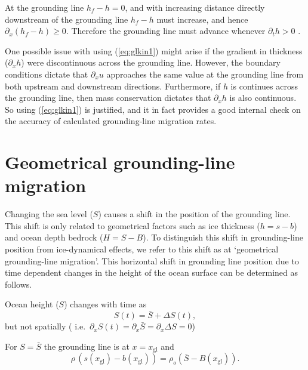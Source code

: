 \documentclass[10pt,a4paper]{book}
\newcommand{\p}{\partial}
\newcommand{\xgl}{x_{\mathrm{gl}}}
\begin{document}
At the grounding line $h_f-h=0$, and with increasing distance directly
downstream of the grounding line $h_f-h$ must increase, and hence
$\p_x (h_f -h) \ge 0$.  Therefore the grounding line must advance
whenever $\p_t h > 0$ .


One possible issue with using (\ref{eq:glkin1}) might arise if the
gradient in thickness ($\p_x h$) were discontinuous across the
grounding line. However, the boundary conditions dictate that $\p_x u$
approaches the same value at the grounding line from both upstream and
downstream directions. Furthermore, if $h$ is continues across the
grounding line, then mass conservation dictates that $\p_x h$ is also
continuous. So using (\ref{eq:glkin1}) is justified, and it in fact
provides a good internal check on the accuracy of calculated
grounding-line migration rates.


\section{Geometrical grounding-line migration}



Changing the sea level ($S$) causes a shift in the position of the
grounding line. This shift is only related to geometrical factors such
as ice thickness ($h=s-b$) and ocean depth bedrock ($H=S-B$). To
distinguish this shift in grounding-line position from ice-dynamical
effects, we refer to this shift as at `geometrical grounding-line
migration'. This horizontal shift in grounding line position due to
time dependent changes in the height of the ocean surface can be determined as
follows.


Ocean height ($S$) changes with time as
\[
S(t)=\bar{S}+\Delta S(t) ,
\]
but not spatially ( i.e.\ $\p_x S(t) = \p_x \bar{S} = \p_x \Delta S=0$) 

For $S=\bar{S}$ the grounding line is at  $x=\xgl$ and
\begin{equation}
\rho \, \left (s(\xgl)-b(\xgl) \right )=\rho_o (\bar{S}-B(\xgl)) .
\label{eq:mean}
\end{equation}

\end{document}
